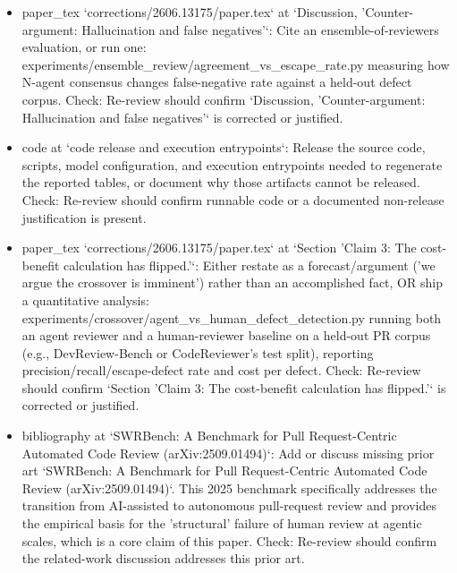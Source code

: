 \documentclass[11pt]{article}
\begin{document}
\begin{itemize}[leftmargin=*]
  \item [open] paper\_tex `corrections/2606.13175/paper.tex` at `Discussion, 'Counter-argument: Hallucination and false negatives'`: Cite an ensemble-of-reviewers evaluation, or run one: experiments/ensemble\_review/agreement\_vs\_escape\_rate.py measuring how N-agent consensus changes false-negative rate against a held-out defect corpus. Check: Re-review should confirm `Discussion, 'Counter-argument: Hallucination and false negatives'` is corrected or justified.
  \item [open] code at `code release and execution entrypoints`: Release the source code, scripts, model configuration, and execution entrypoints needed to regenerate the reported tables, or document why those artifacts cannot be released. Check: Re-review should confirm runnable code or a documented non-release justification is present.
  \item [open] paper\_tex `corrections/2606.13175/paper.tex` at `Section 'Claim 3: The cost-benefit calculation has flipped.'`: Either restate as a forecast/argument ('we argue the crossover is imminent') rather than an accomplished fact, OR ship a quantitative analysis: experiments/crossover/agent\_vs\_human\_defect\_detection.py running both an agent reviewer and a human-reviewer baseline on a held-out PR corpus (e.g., DevReview-Bench or CodeReviewer's test split), reporting precision/recall/escape-defect rate and cost per defect. Check: Re-review should confirm `Section 'Claim 3: The cost-benefit calculation has flipped.'` is corrected or justified.
  \item [open] bibliography at `SWRBench: A Benchmark for Pull Request-Centric Automated Code Review (arXiv:2509.01494)`: Add or discuss missing prior art `SWRBench: A Benchmark for Pull Request-Centric Automated Code Review (arXiv:2509.01494)`. This 2025 benchmark specifically addresses the transition from AI-assisted to autonomous pull-request review and provides the empirical basis for the 'structural' failure of human review at agentic scales, which is a core claim of this paper. Check: Re-review should confirm the related-work discussion addresses this prior art.
\end{itemize}
\end{document}
